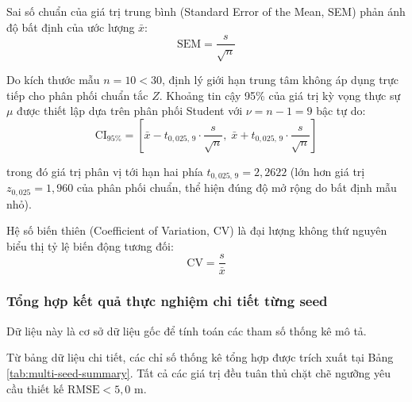 Sai số chuẩn của giá trị trung bình (Standard Error of the Mean, SEM) phản ánh độ bất định của ước lượng $\bar{x}$:
\begin{equation}
\text{SEM} = \frac{s}{\sqrt{n}}
\label{eq:sem}
\end{equation}

Do kích thước mẫu $n = 10 < 30$, định lý giới hạn trung tâm không áp dụng trực tiếp cho phân phối chuẩn tắc $Z$. Khoảng tin cậy 95\% của giá trị kỳ vọng thực sự $\mu$ được thiết lập dựa trên phân phối Student với $\nu = n - 1 = 9$ bậc tự do:
\begin{equation}
\text{CI}_{95\%} = \left[ \bar{x} - t_{0{,}025, \, 9} \cdot \frac{s}{\sqrt{n}}, \; \bar{x} + t_{0{,}025, \, 9} \cdot \frac{s}{\sqrt{n}} \right]
\label{eq:confidence-interval}
\end{equation}

trong đó giá trị phân vị tới hạn hai phía $t_{0{,}025, \, 9} = 2{,}2622$ (lớn hơn giá trị $z_{0{,}025} = 1{,}960$ của phân phối chuẩn, thể hiện đúng độ mở rộng do bất định mẫu nhỏ).

Hệ số biến thiên (Coefficient of Variation, CV) là đại lượng không thứ nguyên biểu thị tỷ lệ biến động tương đối:
\begin{equation}
\text{CV} = \frac{s}{\bar{x}}
\label{eq:cv-formula}
\end{equation}

\subsubsection{Tổng hợp kết quả thực nghiệm chi tiết từng seed}

 Dữ liệu này là cơ sở dữ liệu gốc để tính toán các tham số thống kê mô tả.

Từ bảng dữ liệu chi tiết, các chỉ số thống kê tổng hợp được trích xuất tại Bảng \ref{tab:multi-seed-summary}. Tất cả các giá trị đều tuân thủ chặt chẽ ngưỡng yêu cầu thiết kế $\text{RMSE} < 5{,}0$ m.

